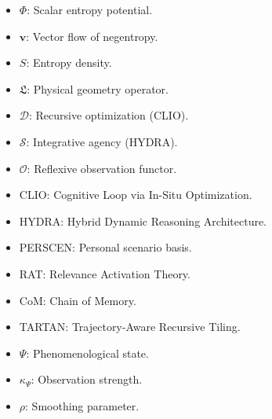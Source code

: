 \documentclass[12pt]{book}
\theoremstyle{definition}
\begin{document}
\begin{itemize}
\item \(\Phi\): Scalar entropy potential.
\item \(\mathbf{v}\): Vector flow of negentropy.
\item \(S\): Entropy density.
\item \(\mathfrak{L}\): Physical geometry operator.
\item \(\mathcal{D}\): Recursive optimization (CLIO).
\item \(\mathcal{S}\): Integrative agency (HYDRA).
\item \(\mathcal{O}\): Reflexive observation functor.
\item \textsf{CLIO}: Cognitive Loop via In-Situ Optimization.
\item \textsf{HYDRA}: Hybrid Dynamic Reasoning Architecture.
\item \textsf{PERSCEN}: Personal scenario basis.
\item \textsf{RAT}: Relevance Activation Theory.
\item \textsf{CoM}: Chain of Memory.
\item \textsf{TARTAN}: Trajectory-Aware Recursive Tiling.
\item \(\Psi\): Phenomenological state.
\item \(\kappa_\Psi\): Observation strength.
\item \(\rho\): Smoothing parameter.
\end{itemize}

\printindex
\end{document}
